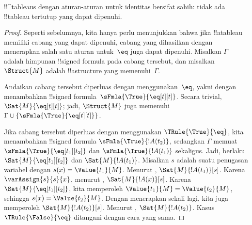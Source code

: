 \documentclass[../../../include/open-logic-section]{subfiles}
\begin{document}


\begin{prop}
!!^{tableau}s dengan aturan-aturan untuk identitas bersifat sahih: tidak
ada !!{tableau} tertutup yang dapat dipenuhi.
\end{prop}

\begin{proof}
Seperti sebelumnya, kita hanya perlu menunjukkan bahwa jika !!a{tableau}
memiliki cabang yang dapat dipenuhi, cabang yang dihasilkan dengan
menerapkan salah satu aturan untuk~$\eq$ juga dapat dipenuhi. Misalkan
$\Gamma$ adalah himpunan !!{signed formula} pada cabang tersebut, dan
misalkan $\Struct{M}$ adalah !!a{structure} yang memenuhi~$\Gamma$.

Andaikan cabang tersebut diperluas dengan menggunakan~$\eq$, yakni
dengan menambahkan !!{signed formula}~$\sFmla{\True}{\eq[t][t]}$.
Secara trivial, $\Sat{M}{\eq[t][t]}$; jadi, $\Struct{M}$ juga memenuhi
$\Gamma \cup \{\sFmla{\True}{\eq[t][t]}\}$.

Jika cabang tersebut diperluas dengan menggunakan
$\TRule{\True}{\eq}$, kita menambahkan !!{signed formula}
$\sFmla{\True}{!A(t_2)}$, sedangkan $\Gamma$ memuat
$\sFmla{\True}{\eq[t_1][t_2]}$ dan $\sFmla{\True}{!A(t_1)}$ sekaligus.
Jadi, berlaku $\Sat{M}{\eq[t_1][t_2]}$ dan
$\Sat{M}{!A(t_1)}$. Misalkan $s$ adalah suatu penugasan variabel dengan
$s(x) = \Value{t_1}{M}$. Menurut
, $\Sat{M}{!A(t_1)}[s]$. Karena
$\varAssign{s}{s}{x}$, menurut ,
$\Sat{M}{!A(x)}[s]$. Karena $\Sat{M}{\eq[t_1][t_2]}$, kita memperoleh
$\Value{t_1}{M} = \Value{t_2}{M}$, sehingga
$s(x) = \Value{t_2}{M}$. Dengan menerapkan
 sekali lagi, kita juga memperoleh
$\Sat{M}{!A(t_2)}[s]$. Menurut
, $\Sat{M}{!A(t_2)}$. Kasus
$\TRule{\False}{\eq}$ ditangani dengan cara yang sama.
\end{proof}
\end{document}
